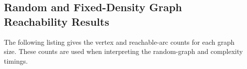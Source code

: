 



\subsection{Random and Fixed-Density Graph Reachability Results}
The following listing gives the vertex and reachable-arc counts for each graph size.
These counts are used when interpreting the random-graph and complexity timings.

\clearpage

\FloatBarrier

